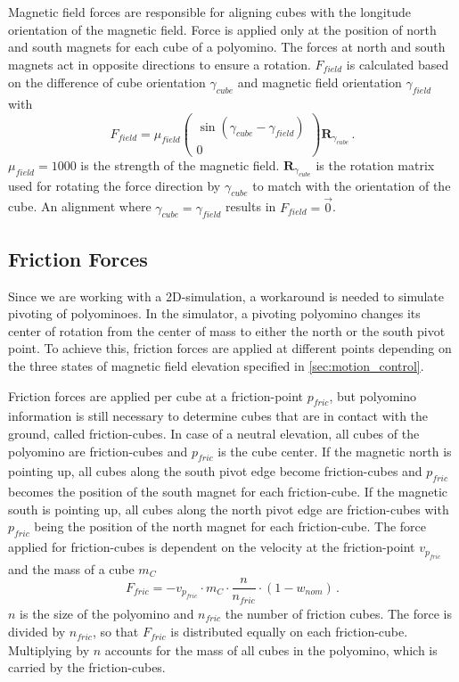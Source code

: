 Magnetic field forces are responsible for aligning cubes with the longitude orientation of the magnetic field.
Force is applied only at the position of north and south magnets for each cube of a polyomino.
The forces at north and south magnets act in opposite directions to ensure a rotation.
$F_\textit{field}$ is calculated based on the difference of cube orientation $\gamma_\textit{cube}$ and magnetic field orientation $\gamma_\textit{field}$ with
\begin{equation}
F_\textit{field} = \mu_\textit{field} \begin{pmatrix} \sin(\gamma_\textit{cube} - \gamma_\textit{field}) \\ 0 \end{pmatrix} \mathbf{R}_{\gamma_\textit{cube}} \, .
\end{equation}
$\mu_\textit{field} = 1000$ is the strength of the magnetic field.
$\mathbf{R}_{\gamma_\textit{cube}}$ is the rotation matrix used for rotating the force direction by $\gamma_\textit{cube}$ to match with the orientation of the cube.
An alignment where $\gamma_\textit{cube} = \gamma_\textit{field}$ results in $F_\textit{field} = \vec{0}$.


\subsection{Friction Forces}
\label{sec:force_friction}

Since we are working with a 2D-simulation, a workaround is needed to simulate pivoting of polyominoes.
In the simulator, a pivoting polyomino changes its center of rotation from the center of mass to either the north or the south pivot point.
To achieve this, friction forces are applied at different points depending on the three states of magnetic field elevation specified in \autoref{sec:motion_control}.

Friction forces are applied per cube at a friction-point $p_\textit{fric}$, but polyomino information is still necessary to determine cubes that are in contact with the ground, called friction-cubes.
In case of a neutral elevation, all cubes of the polyomino are friction-cubes and $p_\textit{fric}$ is the cube center.
If the magnetic north is pointing up, all cubes along the south pivot edge become friction-cubes and $p_\textit{fric}$ becomes the position of the south magnet for each friction-cube.
If the magnetic south is pointing up, all cubes along the north pivot edge are friction-cubes with $p_\textit{fric}$ being the position of the north magnet for each friction-cube.
The force applied for friction-cubes is dependent on the velocity at the friction-point $v_{p_\textit{fric}}$ and the mass of a cube $m_C$
\begin{equation}
F_\textit{fric} = -v_{p_\textit{fric}} \cdot m_C \cdot \frac{n}{n_\textit{fric}} \cdot (1 - w_\textit{nom})\, .
\end{equation}
$n$ is the size of the polyomino and $n_\textit{fric}$ the number of friction cubes.
The force is divided by $n_\textit{fric}$, so that $F_\textit{fric}$ is distributed equally on each friction-cube.
Multiplying by $n$ accounts for the mass of all cubes in the polyomino, which is carried by the friction-cubes.

